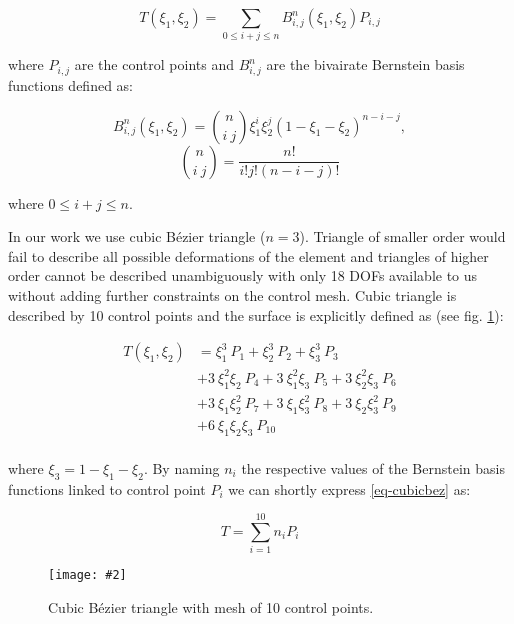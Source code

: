 \documentclass{egpubl}
\newcommand{\Figure}[3]{%
\begin{figure}[htb]
  \centering
  \texttt{[image: \#2]}
  \caption{\label{fig-#2}#3}
\end{figure}}
\begin{document}
\begin{equation}
    T(\xi_1, \xi_2) = \sum_{0 \le i + j \le n} B^n_{i,j}(\xi_1,\xi_2) P_{i,j}
\end{equation}

\noindent
where $P_{i,j}$ are the control points and $B^n_{i,j}$ are the bivairate
Bernstein basis functions defined as:

\begin{equation}
  B^n_{i,j} (\xi_1,\xi_2) =
    \binom{n}{i~j} \xi_1^i \xi_2^j (1-\xi_1-\xi_2)^{n-i-j},
\end{equation}
\begin{equation}
  \binom{n}{i~j} = \frac{n!}{i!j!(n-i-j)!}
\end{equation}

\noindent
where $ 0 \le i+j \le n $.

In our work we use cubic B\'ezier triangle ($n=3$). Triangle of smaller order
would fail to describe all possible deformations of the element and
triangles of higher order cannot be described unambiguously with only 18
DOFs available to us without adding further constraints on the control
mesh. Cubic triangle is described by 10 control points and the surface is
explicitly defined as (see fig. \ref{fig-bezier}):

\begin{equation}\label{eq-cubicbez}
  \begin{split}
  T(\xi_1,\xi_2) & =
             \xi_1^3\ P_1
           + \xi_2^3\ P_2
           + \xi_3^3\ P_3 \\
         & + 3\ \xi_1^2 \xi_2\ P_4
           + 3\ \xi_1^2 \xi_3\ P_5
           + 3\ \xi_2^2 \xi_3\ P_6 \\
         & + 3\ \xi_1 \xi_2^2\ P_7
           + 3\ \xi_1 \xi_3^2\ P_8
           + 3\ \xi_2 \xi_3^2\ P_9 \\
         & + 6\ \xi_1 \xi_2 \xi_3\ P_{10} \\
  \end{split}
\end{equation}

\noindent
where $ \xi_3 = 1 - \xi_1 - \xi_2 $. By naming $n_i$ the respective values
of the Bernstein basis functions linked to control point $P_i$ we can
shortly express \eqref{eq-cubicbez} as:

\begin{equation}\label{eq-cubicbez2}
    T = \sum_{i=1}^{10} n_i P_i
\end{equation}

\Figure{0.8\linewidth}{bezier}
{Cubic B\'ezier triangle with mesh of 10 control points.}
\end{document}
